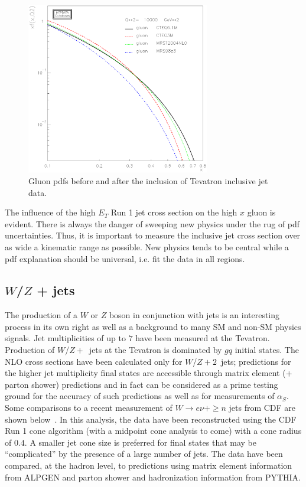 \documentclass[12pt]{iopart}
\def\as{\alpha_S}
\begin{document}
%
\begin{figure}[t]
\begin{center}
\includegraphics[width=8cm]{cteq3_61_mrst.ps}
\end{center}
\caption{
Gluon pdfs before and after the inclusion of Tevatron inclusive jet data.
\label{fig:cteq3_61}}
\end{figure}
%
The influence of the high $E_T$ Run 1 jet cross section on the high $x$ gluon is evident.  There is always the danger of sweeping new
physics under  the rug of pdf uncertainties. Thus, it is important to measure the inclusive jet cross section over as wide a
kinematic range as possible. New physics tends to be central while a pdf explanation should be universal, i.e. fit the data in all
regions. 


\subsection{$W$/$Z$ + jets}
\label{sec:wzjets}

The production of a $W$ or $Z$ boson in conjunction with jets is an interesting process in its own right as well as a background to many SM
and non-SM physics signals. Jet multiplicities of up to $7$ have been measured at the Tevatron. Production of
$W$/$Z +$~jets at the Tevatron is dominated by $gq$ initial states. The NLO cross sections have been calculated
only for $W$/$Z+2$~jets;  predictions for the higher jet multiplicity final states are accessible through matrix  element  (+ parton shower)
predictions and in fact can be considered as a prime testing  ground for the accuracy of such predictions as well as for measurements of
$\as$. Some comparisons to a recent measurement of $W \rightarrow e\nu + \ge n$ jets from CDF are shown below~\cite{cdfqcd}. In this analysis, the
data have been reconstructed using  the CDF Run 1 cone algorithm (with a midpoint cone analysis to come) with a cone  radius of $0.4$. A
smaller jet cone size is preferred  for final states that may be ``complicated'' by the presence of a large number of jets.  The data have
been compared, at the hadron level, to predictions using matrix element information from ALPGEN and parton shower and hadronization
information from PYTHIA.
\end{document}

